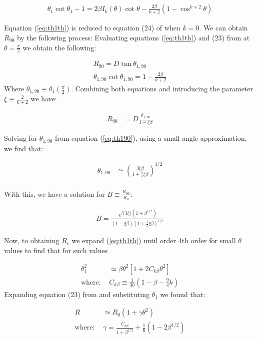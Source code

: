 \begin{align}
\theta_1\cot\theta_1 -1 = 2\beta I_k(\theta) \cot\theta - \frac{2\beta}{k+2}\left(1-\cos^{k+2}\theta\right)
\label{eq:th1th}
\end{align}

Equation (\ref{eq:th1th}) is reduced to equation (24) of \CRW{} when $k=0$.
We can obtain $R_{90}$ by the following process:
Evaluating equations  (\ref{eq:th1th}) and (23) from \CRW{} at $\theta=\frac{\pi}{2}$ we obtain the following:

\begin{align}
R_{90} = D\tan\theta_{1,90} \\
\theta_{1,90}\cot\theta_{1,90} = 1-\frac{2\beta}{k+2} \label{eq:th190}
\end{align}
Where $\theta_{1,90}\equiv \theta_1(\frac{\pi}{2})$. Combining both equations and  introducing the parameter 
$\xi\equiv \frac{2}{k+2}$ we have:

\begin{align}
R_{90} &= D\frac{\theta_{1,90}}{1-\xi\beta} 
\end{align}


Solving for $\theta_{1,90}$ from equation (\ref{eq:th190}), using a small angle  approximation, we find that:

\begin{align}
\theta_{1,90} &\simeq \left(\frac{3\xi\beta}{1+\frac{1}{5}\xi\beta}\right)^{1/2} \\
\label{eq:th190sol}
\end{align}

With this, we have a solution for $B \equiv \frac{R_{90}}{R_0}$:

\begin{align}
B = \frac{\sqrt(3\xi)\left(1+\beta^{1/2}\right)}{(1-\xi\beta)\left(1+\frac{1}{5}\xi\beta\right)^{1/2}}
\label{eq:B}
\end{align}

Now, to obtaining $R_c$ we expand  (\ref{eq:th1th}) until order 4th order for small $\theta$ values to find that for such values

\begin{align}
\theta_1^2 &\simeq \beta\theta^2\left[1+ 2C_{k\beta}\theta^2\right] \\
\mathrm{where:~} & C_{k\beta} \equiv \frac{1}{30}\left(1-\beta-\frac{9}{4}k\right)
\end{align}
Expanding equation (23) from \citep{Canto:1996} and substituting $\theta_1$ we found that:

\begin{align}
R &\simeq R_0 \left(1+\gamma\theta^2\right)
\label{eq:R_approx} \\
\mathrm{where:~} & \gamma = \frac{C_{k\beta}}{1+\beta^{1/2}}+\frac{1}{6}(1-2\beta^{1/2})
\end{align}

